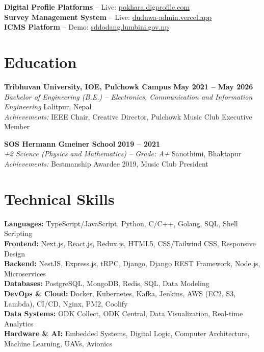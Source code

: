 \documentclass[11pt,a4paper]{article}
\begin{document}
\textbf{Digital Profile Platforms} -- Live: \href{https://pokhara.digprofile.com/en}{pokhara.digprofile.com}\\
\textbf{Survey Management System} -- Live: \href{https://duduwa-admin.vercel.app}{duduwa-admin.vercel.app}\\
\textbf{ICMS Platform} -- Demo: \href{http://sddodang.lumbini.gov.np/ne}{sddodang.lumbini.gov.np}

\section*{Education}

\textbf{Tribhuvan University, IOE, Pulchowk Campus} \hfill \textbf{May 2021 -- May 2026}\\
\textit{Bachelor of Engineering (B.E.) -- Electronics, Communication and Information Engineering} \hfill Lalitpur, Nepal\\
\textit{Achievements:} IEEE Chair, Creative Director, Pulchowk Music Club Executive Member

\textbf{SOS Hermann Gmeiner School} \hfill \textbf{2019 -- 2021}\\
\textit{+2 Science (Physics and Mathematics) -- Grade: A+} \hfill Sanothimi, Bhaktapur\\
\textit{Achievements:} Bestmanship Awardee 2019, Music Club President

\section*{Technical Skills}

\textbf{Languages:} TypeScript/JavaScript, Python, C/C++, Golang, SQL, Shell Scripting\\
\textbf{Frontend:} Next.js, React.js, Redux.js, HTML5, CSS/Tailwind CSS, Responsive Design\\
\textbf{Backend:} NestJS, Express.js, tRPC, Django, Django REST Framework, Node.js, Microservices\\
\textbf{Databases:} PostgreSQL, MongoDB, Redis, SQL, Data Modeling\\
\textbf{DevOps \& Cloud:} Docker, Kubernetes, Kafka, Jenkins, AWS (EC2, S3, Lambda), CI/CD, Nginx, PM2, Coolify\\
\textbf{Data Systems:} ODK Collect, ODK Central, Data Visualization, Real-time Analytics\\
\textbf{Hardware \& AI:} Embedded Systems, Digital Logic, Computer Architecture, Machine Learning, UAVs, Avionics
\end{document}
